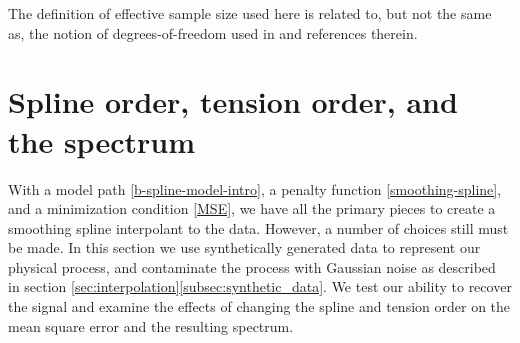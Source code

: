 \documentclass{ametsoc}
\begin{document}
The definition of effective sample size used here is related to, but not the same as, the notion of degrees-of-freedom used in \citet{cantoni2002-biom} and references therein.



%
\section{Spline order, tension order, and the spectrum} \label{sec:spline_order_tension_order_spectrum}
%

With a model path \eqref{b-spline-model-intro}, a penalty function \eqref{smoothing-spline}, and a minimization condition \eqref{MSE}, we have all the primary pieces to create a smoothing spline interpolant to the data. However, a number of choices still must be made. In this section we use synthetically generated data to represent our physical process, and contaminate the process with Gaussian noise as described in section \ref{sec:interpolation}\ref{subsec:synthetic_data}. We test our ability to recover the signal and examine the effects of changing the spline and tension order on the mean square error and the resulting spectrum.
\end{document}
